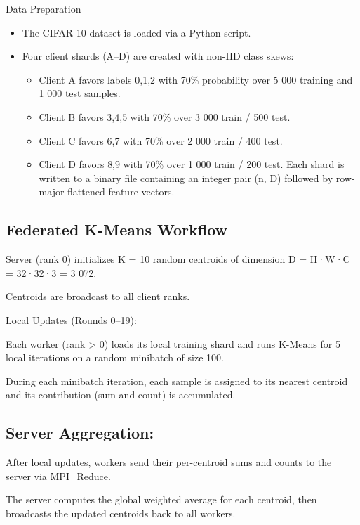 Data Preparation

\begin{itemize}
    \item The CIFAR-10 dataset is loaded via a Python script.
    \item Four client shards (A–D) are created with non-IID class skews:
    \begin{itemize}
        \item Client A favors labels {0,1,2} with 70\% probability over 5 000 training and 1 000 test samples.
        \item Client B favors {3,4,5} with 70\% over 3 000 train / 500 test.
        \item Client C favors {6,7} with 70\% over 2 000 train / 400 test.
        \item Client D favors {8,9} with 70\% over 1 000 train / 200 test.
        Each shard is written to a binary file containing an integer pair (n, D) followed by row-major flattened feature vectors.
    \end{itemize}
\end{itemize}



\subsection{Federated K-Means Workflow}

Server (rank 0) initializes K = 10 random centroids of dimension D = H·W·C = 32·32·3 = 3 072.

Centroids are broadcast to all client ranks.

Local Updates (Rounds 0–19):

Each worker (rank > 0) loads its local training shard and runs K-Means for 5 local iterations on a random minibatch of size 100.

During each minibatch iteration, each sample is assigned to its nearest centroid and its contribution (sum and count) is accumulated.


\subsection{Server Aggregation:}

After local updates, workers send their per-centroid sums and counts to the server via MPI\_Reduce.

The server computes the global weighted average for each centroid, then broadcasts the updated centroids back to all workers.

